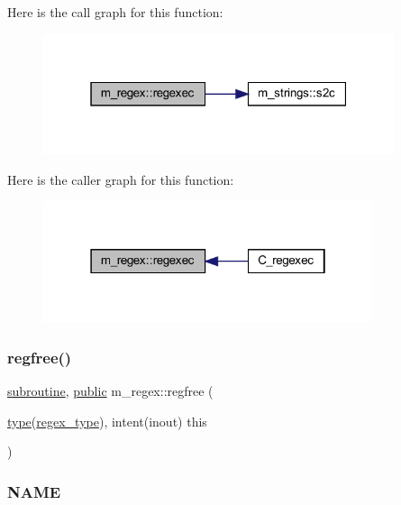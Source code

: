 Here is the call graph for this function\+:
\nopagebreak
\begin{figure}[H]
\begin{center}
\leavevmode
\includegraphics[width=292pt]{namespacem__regex_a44394d605b1a98fb246bc4622a08f878_cgraph}
\end{center}
\end{figure}
Here is the caller graph for this function\+:
\nopagebreak
\begin{figure}[H]
\begin{center}
\leavevmode
\includegraphics[width=274pt]{namespacem__regex_a44394d605b1a98fb246bc4622a08f878_icgraph}
\end{center}
\end{figure}
\mbox{\label{namespacem__regex_a4e4e0028bd3eddc7b2444e90a2129b9e}} 
\subsubsection{\texorpdfstring{regfree()}{regfree()}}
{\footnotesize\ttfamily \hyperlink{M__stopwatch_83_8txt_acfbcff50169d691ff02d4a123ed70482}{subroutine}, \hyperlink{M__stopwatch_83_8txt_a2f74811300c361e53b430611a7d1769f}{public} m\+\_\+regex\+::regfree (\begin{DoxyParamCaption}\item[{\hyperlink{stop__watch_83_8txt_a70f0ead91c32e25323c03265aa302c1c}{type}(\hyperlink{structm__regex_1_1regex__type}{regex\+\_\+type}), intent(inout)}]{this }\end{DoxyParamCaption})}



\subsubsection*{N\+A\+ME}

